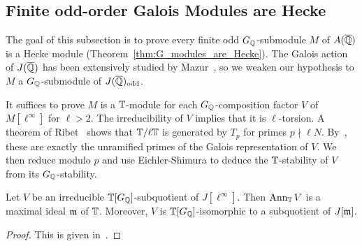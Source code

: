 \documentclass{article}
\newcommand{\odd}{\mathrm{odd}}
\begin{document}
\subsection{Finite odd-order Galois Modules are Hecke}%
\label{sub:finite_odd_order_galois_modules_are_hecke}

The goal of this subsection is to prove every finite odd $G_{\mathbb{Q}}$-submodule $M$
of $A(\overline{\mathbb{Q}})$ is a Hecke module (Theorem~\ref{thm:G_modules_are_Hecke}). The
Galois action of $J(\overline{\mathbb{Q}})$ has been extensively studied by
Mazur~\cite{mazur:eisenstein}, so we weaken our hypothesis to $M$ a
$G_{\mathbb{Q}}$-submodule of $J(\QQbar)_\odd$. 

It suffices to prove $M$ is a $\mathbb{T}$-module for each $G_{\mathbb{Q}}$-composition factor $V$
of $M[\ell^\infty]$ for $\ell>2$. The irreducibility of $V$ implies that it is
$\ell$-torsion. A theorem of Ribet~\cite[Proposition 2]{ribet:mult_p_finite}
shows that $\mathbb{T}/\ell \mathbb{T}$ is generated by $T_p$ for primes $p\nmid \ell N$.
By~\cite[\S 14]{mazur:eisenstein}, these are exactly the unramified primes of
the Galois representation of $V$. We then reduce modulo $p$ and use
Eichler-Shimura to deduce the $\mathbb{T}$-stability of $V$ from its $G_{\mathbb{Q}}$-stability.

\begin{lemma}[Mazur]\label{lemma:cherry_street}
    Let $V$ be an irreducible $\mathbb{T}[G_{\mathbb{Q}}]$-subquotient of $J[\ell^\infty]$. Then
    $\operatorname{Ann}_{\mathbb{T}} V$ is a maximal ideal $\mathfrak{m}$ of $\mathbb{T}$. Moreover, $V$ is
    $\mathbb{T}[G_{\mathbb{Q}}]$-isomorphic to a subquotient of $J[\mathfrak{m}]$.

\end{lemma}
\begin{proof}
    This is given in~\cite[\S 14, pg. 112]{mazur:eisenstein}.
\end{proof}
\end{document}
